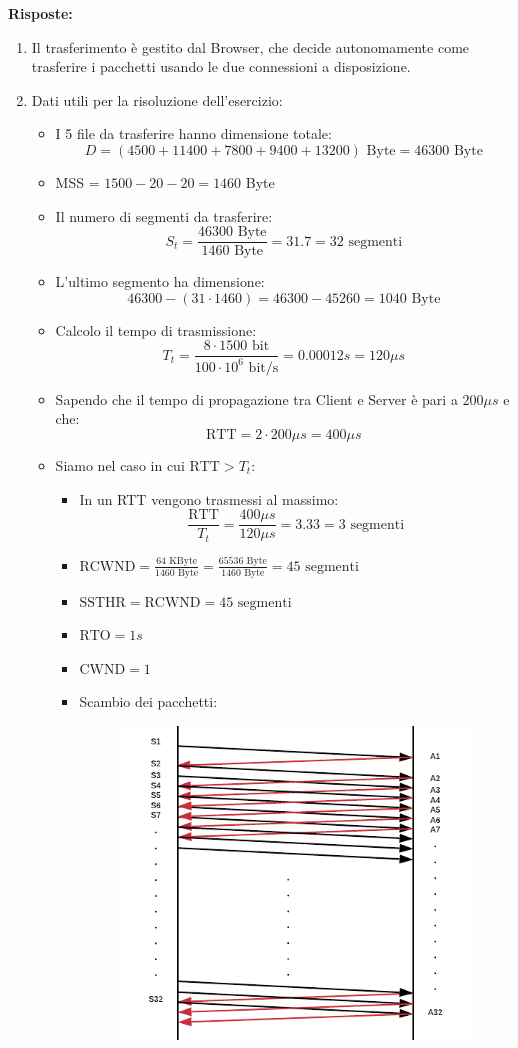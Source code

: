 \documentclass[10pt,a4paper]{article}
\begin{document}
	\textbf{Risposte:}
	\begin{enumerate}
		\item Il trasferimento è gestito dal Browser, che decide autonomamente come trasferire i pacchetti usando le due connessioni a disposizione.
		\item Dati utili per la risoluzione dell'esercizio:
		\begin{itemize}
			\item I 5 file da trasferire hanno dimensione totale: $$D = (4500 + 11400 + 7800 + 9400 + 13200) \textrm{ Byte} = 46300 \textrm { Byte}$$
			\item MSS = $1500 - 20 - 20 = 1460$ Byte
			\item Il numero di segmenti da trasferire: $$S_t = \frac{46300 \textrm{ Byte}}{1460 \textrm{ Byte}} = 31.7 = 32\textrm{ segmenti}$$
			\item L'ultimo segmento ha dimensione: $$46300 - (31 \cdot 1460) = 46300 - 45260 = 1040 \textrm{ Byte}$$
			\item Calcolo il tempo di trasmissione: $$T_t = \frac{8 \cdot 1500 \textrm{ bit}}{100  \cdot 10^6 \textrm{ bit/s}} = 0.00012 s = 120 \mu s$$
			\item Sapendo che il tempo di propagazione tra Client e Server è pari a $200 \mu s$ e che: $$\textrm{RTT} = 2 \cdot 200 \mu s = 400 \mu s$$
			\item Siamo nel caso in cui $\textrm{RTT} > T_t$:
			\begin{itemize}
				\item In un RTT vengono trasmessi al massimo: $$\frac{\textrm{RTT}}{T_t} = \frac{400 \mu s}{120 \mu s} = 3.33 = 3 \textrm{ segmenti}$$
				\item $\textrm{RCWND} = \displaystyle{\frac{64 \text{ KByte}}{1460 \textrm{ Byte}} = \frac{65536 \text{ Byte}}{1460 \textrm{ Byte}} = 45 \textrm{ segmenti}}$
				\item $\textrm{SSTHR} = \textrm{RCWND} = 45 \textrm{ segmenti}$
				\item $\textrm{RTO} = 1s$
				\item $\textrm{CWND} = 1$
				\item Scambio dei pacchetti:
				\begin{figure}[H]
					\centering
					\includegraphics[width=10cm]{Esame1112019_Senzaperdite}

\end{figure}
\end{itemize}
\end{itemize}
\end{enumerate}
\end{document}
